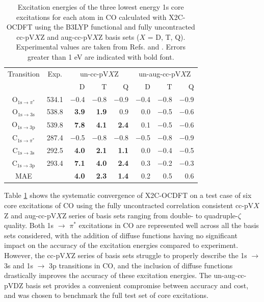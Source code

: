 \documentclass{article}
\begin{document}
\begin{table}[t!]
\center
\caption{Excitation energies of the three lowest energy 1s core excitations for each atom in CO calculated with X2C-OCDFT using the B3LYP functional and fully uncontracted cc-pV$X$Z and aug-cc-pV$X$Z basis sets ($X$ = D, T, Q). Experimental values are taken from Refs.  and . Errors greater than 1 eV are indicated with bold font.}
\begin{tabular}{ccrrrrrr}
\toprule
Transition & Exp. & \multicolumn{3}{c}{un-cc-pV$X$Z}& \multicolumn{3}{c}{un-aug-cc-pV$X$Z} \\ \cmidrule(r){3-5}  \cmidrule(l){6-8}
 & & D \space & T \space & Q \space & D \space & T \space & Q \space \\
\midrule
O$_{1\mathrm{s} \rightarrow \pi^*}$ & 534.1 & $-$0.4 & $-$0.8 & $-$0.9 & $-$0.4 & $-$0.8 & $-$0.9 \\
O$_{1\mathrm{s} \rightarrow 3\mathrm{s}}$ & 538.8 & \textbf{3.9} & \textbf{1.9} & 0.9 & 0.0 & $-$0.5 & $-$0.6 \\
O$_{1\mathrm{s} \rightarrow 3\mathrm{p}}$ & 539.8 & \textbf{7.8} & \textbf{4.1} & \textbf{2.4} & 0.1 & $-$0.5 & $-$0.6 \\
C$_{1\mathrm{s} \rightarrow \pi^*}$ & 287.4 & $-$0.5 & $-$0.8 & $-$0.8 & $-$0.5 & $-$0.8 & $-$0.9 \\
C$_{1\mathrm{s} \rightarrow 3\mathrm{s}}$ & 292.5 & \textbf{4.0} & \textbf{2.1} & \textbf{1.1} & 0.0 & $-$0.4 & $-$0.5 \\
C$_{1\mathrm{s} \rightarrow 3\mathrm{p}}$ & 293.4 & \textbf{7.1} & \textbf{4.0} & \textbf{2.4} & 0.3 & $-$0.2 & $-$0.3 \\[3pt]
MAE & & \textbf{4.0} & \textbf{2.3} & \textbf{1.4} & 0.2 & 0.5 & 0.6 \\ 
\bottomrule
\end{tabular}
\label{table:Basis}
\end{table}

Table \ref{table:Basis} shows the systematic convergence of X2C-OCDFT on a test case of six core excitations of CO using the fully uncontracted correlation consistent cc-pV$X$Z and aug-cc-pV$X$Z series of basis sets ranging from double- to quadruple-$\zeta$ quality. Both 1s $\rightarrow$ $\pi^*$ excitations in CO are represented well across all the basis sets considered, with the addition of diffuse functions having no significant impact on the accuracy of the excitation energies compared to experiment. However, the cc-pV$X$Z series of basis sets struggle to properly describe the 1s $\rightarrow$ 3s and 1s $\rightarrow$ 3p transitions in CO, and the inclusion of diffuse functions drastically improves the accuracy of these excitation energies.
The un-aug-cc-pVDZ basis set provides a convenient compromise between accuracy and cost, and was chosen to benchmark the full test set of core excitations.
\end{document}
